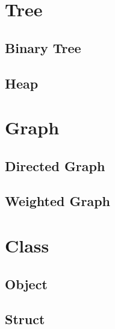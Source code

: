 
\section{Tree}


\subsection{Binary Tree}


\subsection{Heap}


\section{Graph}


\subsection{Directed Graph}


\subsection{Weighted Graph}


\section{Class}


\subsection{Object}


\subsection{Struct}

